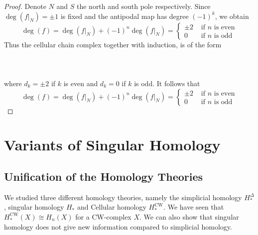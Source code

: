 \documentclass[a4paper]{article}
\begin{document}
\begin{thm}{}{}
\begin{proof}
Denote $N$ and $S$ the north and south pole respectively. Since $\deg(f|_N)=\pm 1$ is fixed and the antipodal map has degree $(-1)^k$, we obtain $$\deg(f)=\deg(f|_N)+(-1)^n\deg(f|_N)=\begin{cases}
\pm2 & \text{ if } n \text{ is even}\\
0 & \text{ if } n \text{ is odd}
\end{cases}$$ Thus the cellular chain complex together with induction, is of the form \\~\\
\\~\\
where $d_k=\pm2$ if $k$ is even and $d_k=0$ if $k$ is odd. It follows that $$\deg(f)=\deg(f|_N)+(-1)^n\deg(f|_N)=\begin{cases}
\pm2 & \text{ if } n \text{ is even}\\
0 & \text{ if } n \text{ is odd}
\end{cases}$$
\end{proof}
\end{thm}

\pagebreak
\section{Variants of Singular Homology}
\subsection{Unification of the Homology Theories}
We studied three different homology theories, namely the simplicial homology $H_\ast^{\Delta}$, singular homology $H_\ast$ and Cellular homology $H_\ast^{\text{CW}}$. We have seen that $H_\ast^{\text{CW}}(X)\cong H_n(X)$ for a CW-complex $X$. We can also show that singular homology does not give new information compared to simplicial homology. 
\end{document}
